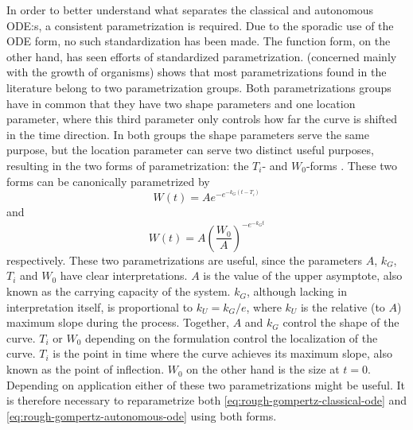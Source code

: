 In order to better understand what separates the classical and autonomous ODE:s, a consistent parametrization is required.
Due to the sporadic use of the ODE form, no such standardization has been made.
The function form, on the other hand, has seen efforts of standardized parametrization.
\cite{tjorve2017gompertz} (concerned mainly with the growth of organisms) shows that most parametrizations found in the literature belong to two parametrization groups.
Both parametrizations groups have in common that they have two shape parameters and one location parameter, where this third parameter only controls how far the curve is shifted in the time direction.
In both groups the shape parameters serve the same purpose, but the location parameter can serve two distinct useful purposes, resulting in the two forms of parametrization: the \(T_i\)- and \(W_0\)-forms \cite{tjorve2017gompertz}.
These two forms can be canonically parametrized by
\begin{equation} \label{eq:gompertz-ti-function}
  W(t) = A e^{-e^{-k_G(t-T_i)}}
\end{equation}
and
\begin{equation} \label{eq:gompertz-w0-function}
  W(t) = A \left(\frac{W_0}{A}\right)^{-e^{-k_G t}}
\end{equation}
respectively.
These two parametrizations are useful, since the parameters \(A\), \(k_G\), \(T_i\) and \(W_0\) have clear interpretations.
\(A\) is the value of the upper asymptote, also known as the carrying capacity of the system.
\(k_G\), although lacking in interpretation itself, is proportional to \(k_U = k_G / e\), where \(k_U\) is the relative (to \(A\)) maximum slope during the process.
Together, \(A\) and \(k_G\) control the shape of the curve.
\(T_i\) or \(W_0\) depending on the formulation control the localization of the curve.
\(T_i\) is the point in time where the curve achieves its maximum slope, also known as the point of inflection.
\(W_0\) on the other hand is the size at \(t=0\).
Depending on application either of these two parametrizations might be useful.
It is therefore necessary to reparametrize both \cref{eq:rough-gompertz-classical-ode} and \cref{eq:rough-gompertz-autonomous-ode} using both forms.

